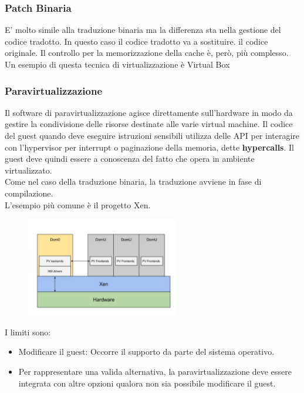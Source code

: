 \documentclass{article}
\begin{document}
		\subsubsection{Patch Binaria}
		E' molto simile alla traduzione binaria ma la differenza sta nella gestione del codice tradotto.
		In questo caso il codice tradotto va a sostituire. il codice originale. Il controllo per la memorizzazione della cache è, però, più complesso.
		Un esempio di questa tecnica di virtualizzazione è Virtual Box
		
		\subsubsection{Paravirtualizzazione}
		Il software di paravirtualizzazione agisce direttamente sull'hardware in modo da gestire la condivisione delle risorse destinate alle varie virtual machine.
		Il codice del guest quando deve eseguire istruzioni sensibili utilizza delle API per interagire con l'hypervisor per interrupt o paginazione della memoria, dette \textbf{hypercalls}. Il guest deve quindi essere a conoscenza del fatto che opera in ambiente virtualizzato.\\
		Come nel caso della traduzione binaria, la traduzione avviene in fase di compilazione.\\
		L'esempio più comune è il progetto Xen.
		
		\begin{figure}[ht]
			\centering
			\includegraphics[width=0.6\textwidth]{SAC_B1_virtualizationIO_Par.png} %
		\end{figure}
		
		I limiti sono:
		\begin{itemize}
		    \item Modificare il guest: Occorre il supporto da parte del sistema operativo.
		    \item Per rappresentare una valida alternativa, la paravirtualizzazione deve essere integrata con altre opzioni qualora non sia possibile modificare il guest.
		\end{itemize}
		
\end{document}
